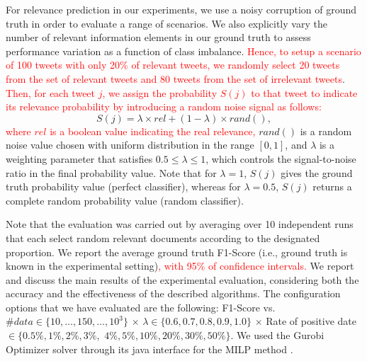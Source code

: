 


For relevance prediction in our experiments, we use a noisy corruption of ground truth in order to evaluate a range of scenarios. %
We also explicitly vary the number of relevant information elements in our ground truth to assess performance variation as a function of class imbalance. \textcolor{red}{ Hence, to setup a scenario of 100 tweets with only 20\% of relevant tweets, we randomly select 20 tweets from the set of relevant tweets and 80 tweets from the set of irrelevant tweets}. \textcolor{red}{Then, for each tweet $j$, we assign the probability $S(j)$ to that tweet to indicate its relevance probability by introducing a random noise signal as follows:}
\begin{equation}
S(j) = \lambda\times rel+(1-\lambda)\times rand()  ,
\end{equation}
\textcolor{red}{ where $rel$ is a boolean value indicating the real relevance,} $rand()$ is a random noise value chosen with uniform distribution in the range $[0,1]$, and $\lambda$ is a weighting parameter  that satisfies $0.5 \leq \lambda \leq 1$, which controls the signal-to-noise ratio in the final probability value. Note that for $\lambda=1$, $S(j)$ gives the ground truth probability value (perfect classifier), whereas for $\lambda=0.5$, $S(j)$ returns a complete random probability value (random classifier).


Note that the evaluation was carried out by averaging over 10 independent runs that each select random relevant documents according to the designated proportion.  We report the average ground truth F1-Score (i.e., ground truth is known in the experimental setting)\textcolor{red}{, with 95\% of confidence intervals.} 
We report and discuss the main results of the experimental evaluation, considering both the accuracy and the effectiveness of the described algorithms. The configuration options that we have evaluated are the following: F1-Score vs. $\#data \in \{10,\dots, 150,\dots, 10^3\}$ $\times$ $ \lambda \in \{  0.6,0.7,0.8,0.9,1.0 \}$ $\times$ Rate of positive date $\in \{0.5\%, 1\%, 2\%, 3\%,$ $ 4\%, 5\%, 10\%, 20\%, 30\%, 50\%\}$. %
We used the Gurobi Optimizer solver through its java interface for the MILP method \cite{gurobi2017gurobi}.

